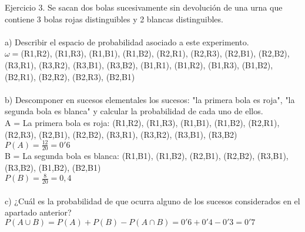 \documentclass{article}
\begin{document}
Ejercicio 3. Se sacan dos bolas sucesivamente sin devolución de una urna que contiene 3 bolas rojas distinguibles y 2 blancas distinguibles. \\ \\
a) Describir el espacio de probabilidad asociado a este experimento. \\
$\omega = ${(R1,R2), (R1,R3), (R1,B1), (R1,B2), (R2,R1), (R2,R3), (R2,B1), (R2,B2), (R3,R1), (R3,R2), (R3,B1), (R3,B2), (B1,R1), (B1,R2), (B1,R3), (B1,B2), (B2,R1), (B2,R2), (B2,R3), (B2,B1)} \\ \\
b) Descomponer en sucesos elementales los sucesos: "la primera bola es roja", "la segunda bola es blanca" y calcular la probabilidad de cada uno de ellos. \\
A = La primera bola es roja: {(R1,R2), (R1,R3), (R1,B1), (R1,B2), (R2,R1), (R2,R3), (R2,B1), (R2,B2), (R3,R1), (R3,R2), (R3,B1), (R3,B2)} \\
$P(A) = \frac{12}{20} = 0'6$ \\
B = La segunda bola es blanca: {(R1,B1), (R1,B2), (R2,B1), (R2,B2), (R3,B1), (R3,B2), (B1,B2), (B2,B1)} \\
$P(B) = \frac{8}{20} = 0,4$ \\ \\
c) ¿Cuál es la probabilidad de que ocurra alguno de los sucesos considerados en el apartado anterior? \\
$P(A\cup B) = P(A)+P(B)-P(A\cap B) = 0'6 + 0'4 - 0'3 = 0'7$ \\ \\
\end{document}
